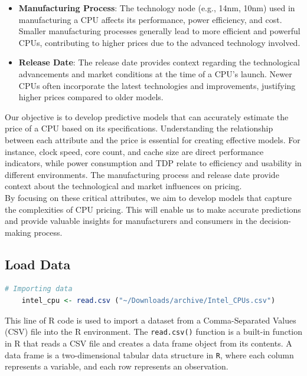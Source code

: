 \begin{itemize}
    \item \textbf{Manufacturing Process}: The technology node (e.g., 14nm, 10nm) used in manufacturing a CPU affects its performance, power efficiency, and cost. Smaller manufacturing processes generally lead to more efficient and powerful CPUs, contributing to higher prices due to the advanced technology involved.
    
    \item \textbf{Release Date}: The release date provides context regarding the technological advancements and market conditions at the time of a CPU's launch. Newer CPUs often incorporate the latest technologies and improvements, justifying higher prices compared to older models.
\end{itemize}

Our objective is to develop predictive models that can accurately estimate the price of a CPU based on its specifications. Understanding the relationship between each attribute and the price is essential for creating effective models. For instance, clock speed, core count, and cache size are direct performance indicators, while power consumption and TDP relate to efficiency and usability in different environments. The manufacturing process and release date provide context about the technological and market influences on pricing.\\

By focusing on these critical attributes, we aim to develop models that capture the complexities of CPU pricing. This will enable us to make accurate predictions and provide valuable insights for manufacturers and consumers in the decision-making process.

\subsection{Load Data}
\begin{lstlisting}[language=R]
    # Importing data 
    intel_cpu <- read.csv ("~/Downloads/archive/Intel_CPUs.csv")
\end{lstlisting}

This line of R code is used to import a dataset from a Comma-Separated Values (CSV) file into the R environment.
The \texttt{read.csv()} function is a built-in function in R that reads a CSV file and creates a data frame object from its contents. A data frame is a two-dimensional tabular data structure in \texttt{R}, where each column represents a variable, and each row represents an observation.\\

